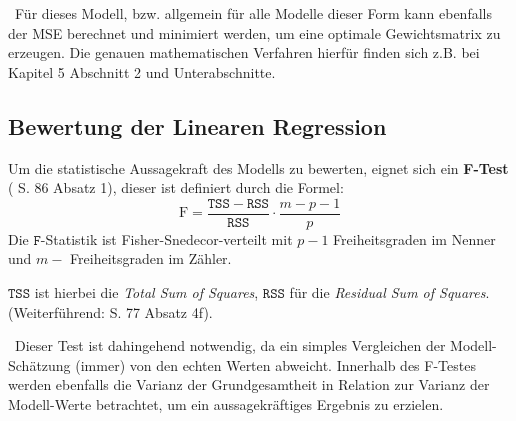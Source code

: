 ~\newline Für dieses Modell, bzw. allgemein für alle Modelle dieser Form kann ebenfalls der MSE berechnet und minimiert werden, um eine optimale Gewichtsmatrix zu erzeugen. Die genauen mathematischen Verfahren hierfür finden sich z.B. bei \cite{stroetmann} Kapitel 5 Abschnitt 2 und Unterabschnitte.
\subsection{Bewertung der Linearen Regression}
\label{subsec:LinRegAcc}
Um die statistische Aussagekraft des Modells zu bewerten, eignet sich ein \textbf{F-Test} (\cite{stroetmann} S. 86 Absatz 1), dieser ist definiert durch die Formel:
\begin{equation}
\label{eq:F-statistic}
\mathrm{F} = \frac{\mathtt{TSS} - \mathtt{RSS}}{\mathtt{RSS}} \cdot \frac{m - p - 1}{p}
\end{equation}
Die $\mathtt{F}$-Statistik ist Fisher-Snedecor-verteilt mit $p-1$ Freiheitsgraden im Nenner und $m-$ Freiheitsgraden im Zähler. 

$\mathtt{TSS}$ ist hierbei die \textit{Total Sum of Squares}, $\mathtt{RSS}$ für die \textit{Residual Sum of Squares}. (Weiterführend: \cite{stroetmann} S. 77 Absatz 4f). 

~\newline Dieser Test ist dahingehend notwendig, da ein simples Vergleichen der Modell-Schätzung (immer) von den echten Werten abweicht. Innerhalb des F-Testes werden ebenfalls die Varianz der Grundgesamtheit in Relation zur Varianz der Modell-Werte betrachtet, um ein aussagekräftiges Ergebnis zu erzielen.  